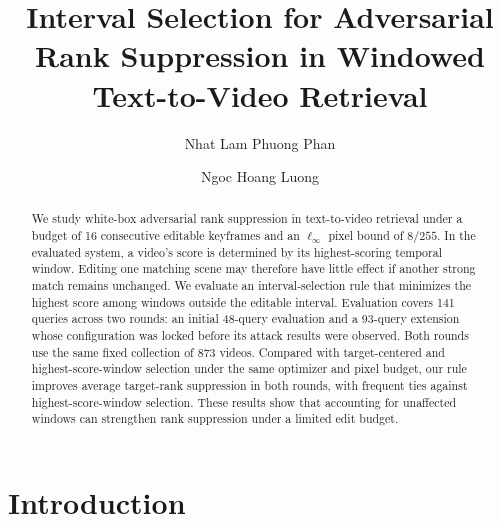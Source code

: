 \documentclass[runningheads]{llncs}
\begin{document}
%
\title{Interval Selection for Adversarial Rank Suppression in Windowed Text-to-Video Retrieval}
%
\author{Nhat Lam Phuong Phan \and
Ngoc Hoang Luong}
%
%
\maketitle

\pagestyle{headings}
\makeatletter
\def\@evenhead{\normalfont\small\hspace{\headlineindent}\leftmark\hfil}
\def\@oddhead{\normalfont\small\hfil\rightmark\hspace{\headlineindent}}
\makeatother
\thispagestyle{empty}
%
\begin{abstract}
We study white-box adversarial rank suppression in text-to-video retrieval under a budget of 16 consecutive editable keyframes and an $\ell_\infty$ pixel bound of $8/255$. In the evaluated system, a video's score is determined by its highest-scoring temporal window. Editing one matching scene may therefore have little effect if another strong match remains unchanged. We evaluate an interval-selection rule that minimizes the highest score among windows outside the editable interval. Evaluation covers 141 queries across two rounds: an initial 48-query evaluation and a 93-query extension whose configuration was locked before its attack results were observed. Both rounds use the same fixed collection of 873 videos. Compared with target-centered and highest-score-window selection under the same optimizer and pixel budget, our rule improves average target-rank suppression in both rounds, with frequent ties against highest-score-window selection. These results show that accounting for unaffected windows can strengthen rank suppression under a limited edit budget.
\end{abstract}
%
\section{Introduction}
\end{document}
